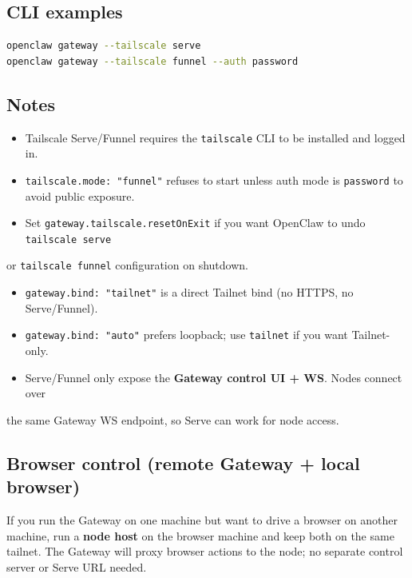 \subsection{CLI examples}


\begin{lstlisting}[language=bash]
openclaw gateway --tailscale serve
openclaw gateway --tailscale funnel --auth password
\end{lstlisting}


\subsection{Notes}


\begin{itemize}
  \item Tailscale Serve/Funnel requires the \texttt{tailscale} CLI to be installed and logged in.
  \item \texttt{tailscale.mode: "funnel"} refuses to start unless auth mode is \texttt{password} to avoid public exposure.
  \item Set \texttt{gateway.tailscale.resetOnExit} if you want OpenClaw to undo \texttt{tailscale serve}
\end{itemize}

or \texttt{tailscale funnel} configuration on shutdown.
\begin{itemize}
  \item \texttt{gateway.bind: "tailnet"} is a direct Tailnet bind (no HTTPS, no Serve/Funnel).
  \item \texttt{gateway.bind: "auto"} prefers loopback; use \texttt{tailnet} if you want Tailnet-only.
  \item Serve/Funnel only expose the \textbf{Gateway control UI + WS}. Nodes connect over
\end{itemize}

the same Gateway WS endpoint, so Serve can work for node access.

\subsection{Browser control (remote Gateway + local browser)}


If you run the Gateway on one machine but want to drive a browser on another machine,
run a \textbf{node host} on the browser machine and keep both on the same tailnet.
The Gateway will proxy browser actions to the node; no separate control server or Serve URL needed.

